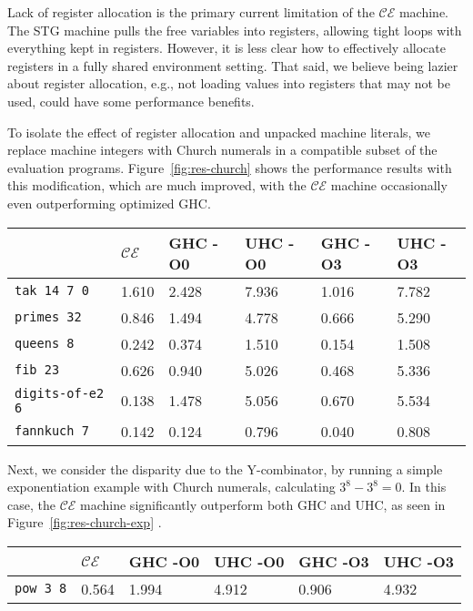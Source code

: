 Lack of register allocation is the primary current limitation of the $\mathcal{CE}$
machine. The STG machine pulls the free variables into registers, allowing tight
loops with everything kept in registers. However, it is less clear how to
effectively allocate registers in a fully shared environment setting.
That said, we believe being lazier about register allocation, e.g., not loading
values into registers that may not be used, could have some performance benefits.

To isolate the effect of register allocation and unpacked machine
literals, we replace machine integers with Church numerals in a compatible
subset of the evaluation programs. Figure~\ref{fig:res-church}
shows the performance results with this modification, which are much improved,
with the $\mathcal{CE}$ machine occasionally even outperforming optimized GHC.

\begin{figure*}
\centering
\begin{tabularx}{\textwidth}{l | X | X | X | X | X}
& $\mathcal{CE}$ & GHC -O0 & UHC -O0 & GHC -O3 & UHC -O3 \\
\hline
\texttt{tak 14 7 0} & 1.610 & 2.428 & 7.936 & 1.016 & 7.782 \\
\texttt{primes 32} & 0.846 & 1.494 & 4.778 & 0.666 & 5.290 \\
\texttt{queens 8} & 0.242 & 0.374 & 1.510 & 0.154 & 1.508 \\
\texttt{fib 23} & 0.626 & 0.940 & 5.026 & 0.468 & 5.336 \\
\texttt{digits-of-e2 6} & 0.138 & 1.478 & 5.056 & 0.670 & 5.534 \\
\texttt{fannkuch 7} & 0.142 & 0.124 & 0.796 & 0.040 & 0.808 \\
\end{tabularx}
\caption{Church Numeral Benchmark Results. Measurement is wall clock time, 
units are seconds. Times averaged over 5 runs.}
\label{fig:res-church}
\end{figure*}

Next, we consider the disparity due to the Y-combinator, by running a simple
exponentiation example with Church numerals, calculating $3^8 - 3^8 = 0$. In
this case, the $\mathcal{CE}$ machine significantly outperform both GHC and UHC,
as seen in Figure~\ref{fig:res-church-exp} .

\begin{figure*}
\begin{tabularx}{\textwidth}{l | X | X | X | X | X}
& $\mathcal{CE}$ & GHC -O0 & UHC -O0 & GHC -O3 & UHC -O3 \\
\hline
\texttt{pow 3 8} & 0.564 & 1.994 & 4.912 & 0.906 & 4.932 \\
\end{tabularx}
\caption{Church Numeral Exponentiation Benchmark Results. Measurement is wall clock time, 
units are seconds. Times averaged over 5 runs.}
\label{fig:res-church-exp}
\end{figure*}

